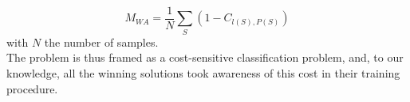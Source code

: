 \begin{equation}
	M_{WA} = \frac{1}{N} \sum_{S} (1-C_{l(S), P(S)})
\end{equation}
with $N$ the number of samples.\\
The problem is thus framed as a cost-sensitive classification problem, and, to our knowledge, all the winning solutions took awareness of this cost in their training procedure.

\begin{table*}[h]
\centering
{}
\caption{Weighted Accuracy Error Table - Error table to ponderate misclassification according to their gap with the ground truth
}
\label{tab:error_table}
\end{table*}

